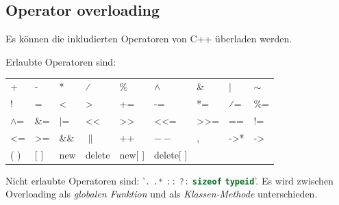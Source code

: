 

\subsection{Operator overloading}

Es können die inkludierten Operatoren von C++ überladen werden.


Erlaubte Operatoren sind:\\
\begin{tabular}{lllllllll}
    +            & -               & * & ⁄                      & \%                           & $\wedge$ 
                & \&                            & $|$              & $\sim$          \\
    !
& =               & \textless{} & \textgreater{}         & +=                           & -=                      & *=                    
        & ⁄=               & \%=             \\
    $\wedge$=    & \&=             & $|$=        & \textless{}\textless{} & \textgreater{}\textgreater{} & \textless{}\textless{}= & \textgreater{}\textgreater{}= & ==               & !=      
        \\
    \textless{}= & \textgreater{}= & \&\&        & $\|$                   & ++                           & $--$                    & ,      
                       & -\textgreater{}* & -\textgreater{} \\
    ( )          & {[} {]}         & new         & delete                 & new{[} {]}                 
  & delete{[} {]}           &                               &                  &                
\end{tabular}\medskip

Nicht erlaubte Operatoren sind: '\lstinline[language=C++]|.|
\quad \lstinline[language=C++]|.*| \quad \lstinline[language=C++]|::| \quad \lstinline[language=C++]|?:| \quad \lstinline[language=C++]|sizeof| \quad \lstinline[language=C++]|typeid|'.
Es wird zwischen Overloading als \textit{globalen Funktion} und als \textit{Klassen-Methode} unterschieden.

